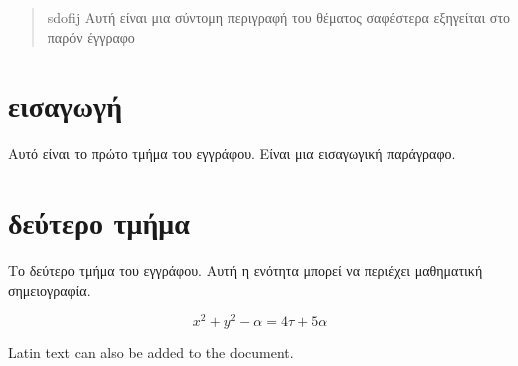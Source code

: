 \documentclass{article}
\begin{document}
\tableofcontents

\begin{abstract}
  sdofij
  Αυτή είναι μια σύντομη περιγραφή του θέματος
  σαφέστερα εξηγείται στο παρόν έγγραφο
\end{abstract}

\section{εισαγωγή}
Αυτό είναι το πρώτο τμήμα του εγγράφου. Είναι
μια εισαγωγική παράγραφο.

\section{δεύτερο τμήμα}
Το δεύτερο τμήμα του εγγράφου. Αυτή η ενότητα
μπορεί να περιέχει μαθηματική σημειογραφία.

\[x^2 + y^2 - α = 4τ + 5α \]

\textlatin{Latin text can also be added to
  the document.}
\end{document}
